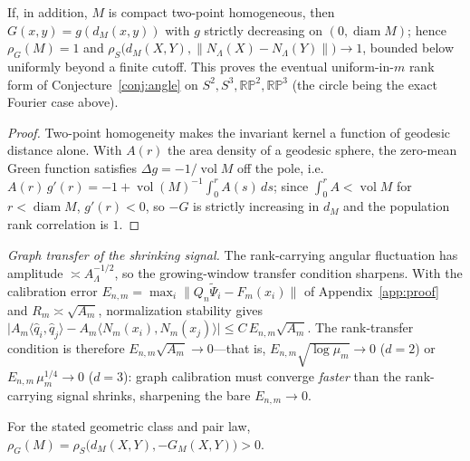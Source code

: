 \documentclass[review,supplement]{siamart220329}
\begin{document}
\begin{corollary}\label{cor:two-point-rank}
If, in addition, $M$ is compact two-point homogeneous, then $G(x,y)=g(d_M(x,y))$ with
$g$ strictly decreasing on $(0,\operatorname{diam}M)$; hence $\rho_G(M)=1$ and
$\rho_S\bigl(d_M(X,Y),\lVert N_\Lambda(X)-N_\Lambda(Y)\rVert\bigr)\to1$, bounded below
uniformly beyond a finite cutoff. This proves the eventual uniform-in-$m$ rank form of
Conjecture~\ref{conj:angle} on $S^2,S^3,\mathbb{RP}^2,\mathbb{RP}^3$ (the circle being
the exact Fourier case above).
\end{corollary}

\begin{proof}
Two-point homogeneity makes the invariant kernel a function of geodesic distance alone.
With $A(r)$ the area density of a geodesic sphere, the zero-mean Green function satisfies
$\Delta g=-1/\operatorname{vol}M$ off the pole, i.e.\
$A(r)\,g'(r)=-1+\operatorname{vol}(M)^{-1}\int_0^r A(s)\,ds$; since
$\int_0^r A<\operatorname{vol}M$ for $r<\operatorname{diam}M$, $g'(r)<0$, so $-G$ is
strictly increasing in $d_M$ and the population rank correlation is $1$.
\end{proof}

\noindent\emph{Graph transfer of the shrinking signal.} The rank-carrying angular
fluctuation has amplitude $\asymp A_\Lambda^{-1/2}$, so the growing-window transfer
condition sharpens. With the calibration error
$E_{n,m}=\max_i\lVert Q_n\widetilde\Psi_i-F_m(x_i)\rVert$ of Appendix~\ref{app:proof} and
$R_m\asymp\sqrt{A_m}$, normalization stability gives
$\bigl\lvert A_m\langle\widehat q_i,\widehat q_j\rangle-A_m\langle N_m(x_i),N_m(x_j)\rangle\bigr\rvert
\le C\,E_{n,m}\sqrt{A_m}$. The rank-transfer condition is therefore
$E_{n,m}\sqrt{A_m}\to0$---that is, $E_{n,m}\sqrt{\log\mu_m}\to0$ ($d=2$) or
$E_{n,m}\,\mu_m^{1/4}\to0$ ($d=3$): graph calibration must converge \emph{faster} than
the rank-carrying signal shrinks, sharpening the bare $E_{n,m}\to0$.

\begin{conjecture}\label{conj:green-rank}
For the stated geometric class and pair law,
$\rho_G(M)=\rho_S\bigl(d_M(X,Y),-G_M(X,Y)\bigr)>0$.
\end{conjecture}
\end{document}
